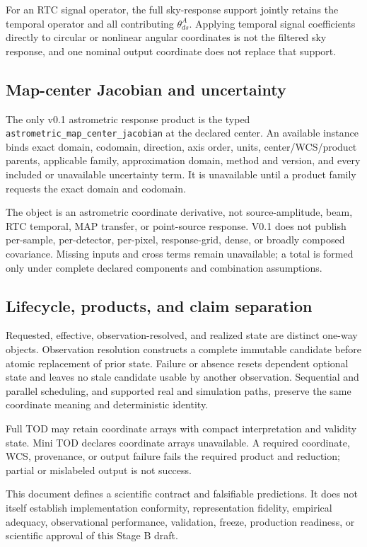 For an RTC signal operator, the full sky-response support jointly retains the
temporal operator and all contributing $\theta^A_{ds}$.  Applying temporal
signal coefficients directly to circular or nonlinear angular coordinates is
not the filtered sky response, and one nominal output coordinate does not
replace that support.

\subsection{Map-center Jacobian and uncertainty}

The only v0.1 astrometric response product is the typed
\texttt{astrometric\_map\_center\_jacobian} at the declared center.  An
available instance binds exact domain, codomain, direction, axis order, units,
center/WCS/product parents, applicable family, approximation domain, method
and version, and every included or unavailable uncertainty term.  It is
unavailable until a product family requests the exact domain and codomain.

The object is an astrometric coordinate derivative, not source-amplitude,
beam, RTC temporal, MAP transfer, or point-source response.  V0.1 does not
publish per-sample, per-detector, per-pixel, response-grid, dense, or broadly
composed covariance.  Missing inputs and cross terms remain unavailable; a
total is formed only under complete declared components and combination
assumptions.

\subsection{Lifecycle, products, and claim separation}

Requested, effective, observation-resolved, and realized state are distinct
one-way objects.  Observation resolution constructs a complete immutable
candidate before atomic replacement of prior state.  Failure or absence resets
dependent optional state and leaves no stale candidate usable by another
observation.  Sequential and parallel scheduling, and supported real and
simulation paths, preserve the same coordinate meaning and deterministic
identity.

Full TOD may retain coordinate arrays with compact interpretation and validity
state.  Mini TOD declares coordinate arrays unavailable.  A required
coordinate, WCS, provenance, or output failure fails the required product and
reduction; partial or mislabeled output is not success.

This document defines a scientific contract and falsifiable predictions.  It
does not itself establish implementation conformity, representation fidelity,
empirical adequacy, observational performance, validation, freeze, production
readiness, or scientific approval of this Stage B draft.
